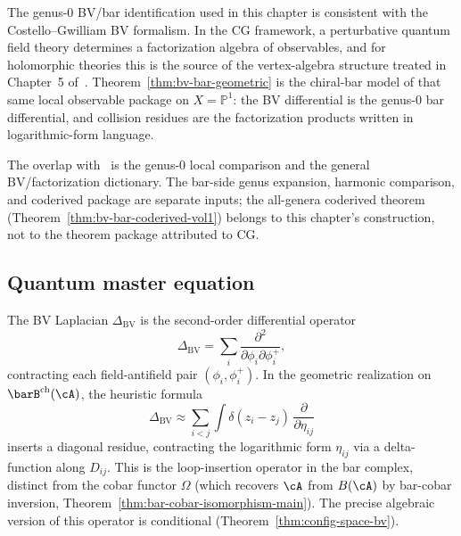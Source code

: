 \begin{remark}
The genus-$0$ BV/bar identification used in this chapter is consistent
with the Costello--Gwilliam BV formalism. In the CG framework, a
perturbative quantum field theory determines a factorization algebra of
observables, and for holomorphic theories this is the source of the
vertex-algebra structure treated in Chapter~5 of~\cite{CG17}.
Theorem~\ref{thm:bv-bar-geometric} is the chiral-bar model of that same
local observable package on $X=\mathbb{P}^1$: the BV differential is
the genus-$0$ bar differential, and collision residues are the
factorization products written in logarithmic-form language.

The overlap with~\cite{CG17} is the genus-$0$ local comparison and the
general BV/factorization dictionary. The bar-side genus expansion,
harmonic comparison, and coderived package are separate inputs; the
all-genera coderived theorem
\textup{(}Theorem~\ref{thm:bv-bar-coderived-vol1}\textup{)} belongs to
this chapter's construction, not to the theorem package attributed to CG.
\end{remark}

\subsection{Quantum master equation}

\begin{definition}[BV Laplacian]
\label{def:bv-laplacian}
The BV Laplacian $\Delta_{\mathrm{BV}}$ is the second-order differential operator
\[
\Delta_{\mathrm{BV}} = \sum_i \frac{\partial^2}{\partial \phi_i \partial \phi_i^+},
\]
contracting each field-antifield pair $(\phi_i, \phi_i^+)$.
In the geometric realization on $\barB^{\mathrm{ch}}(\cA)$, the heuristic formula
\[
\Delta_{\mathrm{BV}} \approx \sum_{i<j} \int \delta(z_i - z_j)\,
\frac{\partial}{\partial \eta_{ij}}
\]
inserts a diagonal residue, contracting the logarithmic form $\eta_{ij}$ via a
delta-function along $D_{ij}$. This is the loop-insertion operator in the bar
complex, distinct from the cobar functor $\Omega$ (which recovers $\cA$ from
$B(\cA)$ by bar-cobar inversion, Theorem~\ref{thm:bar-cobar-isomorphism-main}).
The precise algebraic version of this operator is conditional
\textup{(}Theorem~\ref{thm:config-space-bv}\textup{)}.
\end{definition}

